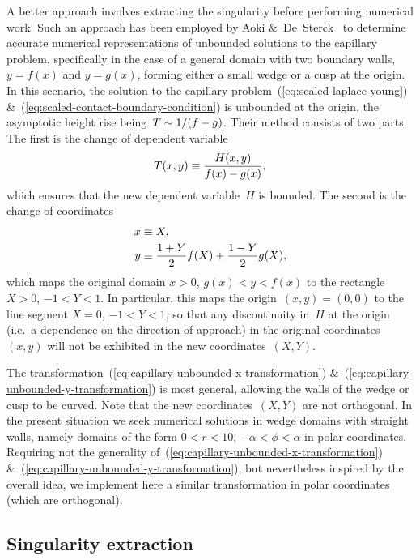 A better approach involves extracting the singularity
before performing numerical work.
Such an approach has been employed by
Aoki \&~De~Sterck~\cite{aoki-2014-numerical-study-unbounded-capillary}
to determine accurate numerical representations
of unbounded solutions to the capillary problem,
specifically in the case of a general domain with two boundary walls,
$y = f (x)$ and $y = g (x)$,
forming either a small wedge or a cusp at the origin.
In this scenario,
the solution to the capillary problem~(\ref{eq:scaled-laplace-young})
\&~(\ref{eq:scaled-contact-boundary-condition})
is unbounded at the origin,
the asymptotic height rise being~$T \sim 1 / (f - g)$.
Their method consists of two parts.
The first is the change of dependent variable
\begin{equation}
  T (x, y) \equiv \frac{H (x, y)}{f (x) - g(x)},
  \label{eq:capillary-unbounded-change-of-variable}
\end{equation}
which ensures that the new dependent variable~$H$ is bounded.
The second is the change of coordinates
\begin{align}
  x &\equiv X,
    \label{eq:capillary-unbounded-x-transformation} \\
  y &\equiv \frac{1 + Y}{2} f (X) + \frac{1 - Y}{2} g (X),
    \label{eq:capillary-unbounded-y-transformation}
\end{align}
which maps the original domain $x > 0$, $g (x) < y < f (x)$
to the rectangle $X > 0$, $-1 < Y < 1$.
In particular, this maps the origin~$(x, y) = (0, 0)$
to the line segment $X = 0$, $-1 < Y < 1$,
so that any discontinuity in~$H$ at the origin
(i.e.~a dependence on the direction of approach)
in the original coordinates~$(x, y)$
will not be exhibited in the new coordinates~$(X, Y)$.

The transformation~(\ref{eq:capillary-unbounded-x-transformation})
\&~(\ref{eq:capillary-unbounded-y-transformation})
is most general,
allowing the walls of the wedge or cusp to be curved.
Note that the new coordinates~$(X, Y)$ are not orthogonal.
In the present situation
we seek numerical solutions in wedge domains with straight walls,
namely domains of the form
$0 < r < 10$, $-\alpha < \phi < \alpha$
in polar coordinates.
Requiring not the generality of~(\ref{eq:capillary-unbounded-x-transformation})
\&~(\ref{eq:capillary-unbounded-y-transformation}),
but nevertheless inspired by the overall idea,
we implement here a similar transformation in polar coordinates
(which are orthogonal).

\subsection{Singularity extraction}
\label{sec:small.numerical.extraction}

